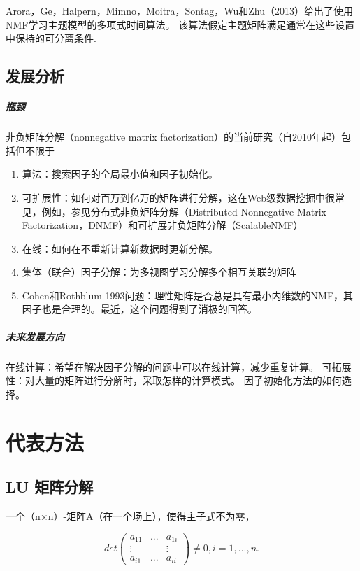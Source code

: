 \documentclass{ctexrep}
\begin{document}
Arora，Ge，Halpern，Mimno，Moitra，Sontag，Wu和Zhu（2013）给出了使用NMF学习主题模型的多项式时间算法。 该算法假定主题矩阵满足通常在这些设置中保持的可分离条件.


\section{发展分析}
\paragraph{瓶颈}

非负矩阵分解（nonnegative matrix factorization）的当前研究（自2010年起）包括但不限于
\begin{enumerate}
    \item 算法：搜索因子的全局最小值和因子初始化。
     \item 可扩展性：如何对百万到亿万的矩阵进行分解，这在Web级数据挖掘中很常见，例如，参见分布式非负矩阵分解（Distributed Nonnegative Matrix Factorization，DNMF）和可扩展非负矩阵分解（ScalableNMF）
      \item 在线：如何在不重新计算新数据时更新分解。
       \item 集体（联合）因子分解：为多视图学习分解多个相互关联的矩阵
        \item  Cohen和Rothblum 1993问题：理性矩阵是否总是具有最小内维数的NMF，其因子也是合理的。最近，这个问题得到了消极的回答。
\end{enumerate}
\paragraph{未来发展方向}

在线计算：希望在解决因子分解的问题中可以在线计算，减少重复计算。
可拓展性：对大量的矩阵进行分解时，采取怎样的计算模式。
因子初始化方法的如何选择。

\chapter{代表方法}
\label{chap:method}
\section{LU 矩阵分解}
一个（n×n）-矩阵A（在一个场上），使得主子式不为零，

\begin{equation}
det(\begin{matrix}
a_{11} & ... & a_{1i}\\ 
 \vdots &  &  \vdots\\ 
a_{i1} & ... & a_{ii} 
\end{matrix}) \neq 0, i=1,...,n.    
\end{equation}
\end{document}
